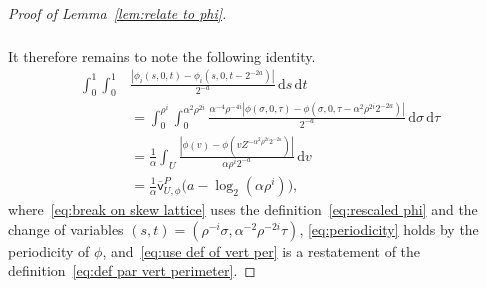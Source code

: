 \documentclass[11pt,reqno]{amsart}
\newcommand{\ud}[0]{\,\mathrm{d}}
\newcommand{\0}{\mathbf{0}}
\renewcommand{\1}{\mathbf 1}
\theoremstyle{remark}
\newcommand{\vpP}[1]{{\overline{\mathsf{v}}^{P}_{\!#1}}}
\begin{document}
\begin{proof}[Proof of Lemma~\ref{lem:relate to phi}]
\begin{align}
\begin{split}
\end{split}
\end{align}
It therefore remains to note the following identity.
\begin{align}
  \int_0^1\int_0^1&\frac{|\phi_i(s,0,t)-\phi_i(s,0,t-2^{-2a})|}{2^{-a}}\ud s\ud t\nonumber \\
  \label{eq:break on skew lattice} & =\int_{0}^{\rho^i} \int_{0}^{\alpha^2 \rho^{2i}}\frac{\alpha^{-4}\rho^{-4i}|\phi(\sigma,0,\tau)-\phi(\sigma,0,\tau-\alpha^2\rho^{2i}2^{-2a})|}{2^{-a}}\ud \sigma\ud \tau\\
& \label{eq:periodicity}=\frac{1}{\alpha}\int_U \frac{|\phi(v)-\phi(vZ^{-\alpha^2\rho^{2i}2^{-2a}})|}{\alpha \rho^i 2^{-a}}\ud v\\
& \label{eq:use def of vert per}= \frac{1}{\alpha}\vpP{U,\phi}\big(a-\log_2(\alpha\rho^i)\big),
\end{align}
where~\eqref{eq:break on skew lattice} uses the definition~\eqref{eq:rescaled phi} and the change of variables $(s,t)=(\rho^{-i}\sigma,\alpha^{-2}\rho^{-2i}\tau)$, \eqref{eq:periodicity} holds by the periodicity of $\phi$, and~\eqref{eq:use def of vert per} is a restatement of the definition~\eqref{eq:def par vert perimeter}.
\end{proof}
\end{document}
